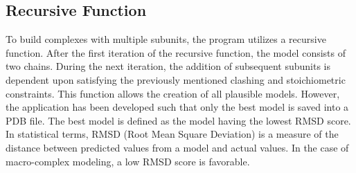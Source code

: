 \documentclass[a4paper,12pt]{article}
\begin{document}
\subsection{Recursive Function}
To build complexes with multiple subunits, the program utilizes a recursive function. After the first iteration of the recursive function, the model consists of two chains. During the next iteration, the addition of subsequent subunits is dependent upon satisfying the previously mentioned clashing and stoichiometric constraints. This function allows the creation of all plausible models. However, the application has been developed such that only the best model is saved into a PDB file. The best model is defined as the model having the lowest RMSD score. In statistical terms, RMSD (Root Mean Square Deviation) is a measure of the distance between predicted values from a model and actual values. In the case of macro-complex modeling, a low RMSD score is favorable. 
\end{document}
